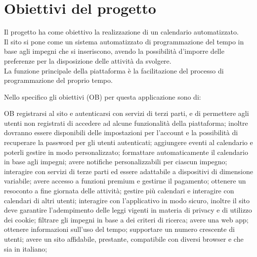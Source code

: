 \section{Obiettivi del progetto}
\label{secD1:ObiettiviDelProgetto}

Il progetto ha come obiettivo la realizzazione di un calendario automatizzato.\\
Il sito si pone come un sistema automatizzato di programmazione del tempo in base agli impegni che si inseriscono, avendo la possibilità d'imporre delle preferenze per la disposizione delle attività da svolgere.\\
La funzione principale della piattaforma è la facilitazione del processo di programmazione del proprio tempo.

\vspace{0.5cm}

Nello specifico gli obiettivi (OB) per questa applicazione sono di:
\begin{listaPersonale}{OB}
       registrarsi al sito e autenticarsi con servizi di terzi parti, e di permettere agli utenti non registrati di accedere ad alcune funzionalità della piattaforma; inoltre dovranno essere disponibili delle impostazioni per l'account e la possibilità di recuperare la password per gli utenti autenticati;
       aggiungere eventi al calendario e poterli gestire in modo personalizzato;
       formattare automaticamente il calendario in base agli impegni;
       avere notifiche personalizzabili per ciascun impegno;
       interagire con servizi di terze parti ed essere adattabile a dispositivi di dimensione variabile;
       avere accesso a funzioni premium e gestirne il pagamento;
       ottenere un resoconto a fine giornata delle attività;
       gestire più calendari e interagire con calendari di altri utenti;
       interagire con l'applicativo in modo sicuro, inoltre il sito deve garantire l'adempimento delle leggi vigenti in materia di privacy e di utilizzo dei cookie;
       filtrare gli impegni in base a dei criteri di ricerca;
       avere una web app;
       ottenere informazioni sull'uso del tempo;
       supportare un numero crescente di utenti;
       avere un sito affidabile, prestante, compatibile con diversi browser e che sia in italiano;
\end{listaPersonale}
